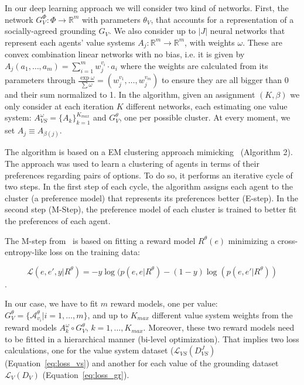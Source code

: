 \documentclass{ecai}
\newcommand{\R}{\mathbb{R}}
\newcommand{\A}{\mathcal{A}}
\newcommand{\abs}[1]{{\left|#1\right|}}
\begin{document}
In our deep learning approach we will consider two kind of networks. First, the network $G^\Phi_V : \Phi \to \R^m$ with parameters $\theta_V$, that accounts for a representation of a socially-agreed grounding $G_V$. We also consider up to $\abs{J}$ neural networks that represent each agents' value systems $A_j : \R^m \to \R^m$, with weights $\omega$. These are convex combination linear networks with no bias, i.e. it is given by $A_j (a_1, \dots, a_m) = \sum_{i=1}^m w_j^{v_i}\cdot a_i$ where the weights are calculated from its parameters through $\frac{\exp \omega}{\sum \omega} = (w_j^{v_1}, \dots, w_j^{v_m})$ to ensure they are all bigger than 0 and their sum normalized to 1. In the algorithm, given an assignment $(K,\beta)$ we only consider at each iteration $K$ different networks, each estimating one value system: $A_{VS}^\omega =\{A_{k}\}_{k=1}^{K_{max}}$ and $G_V^\theta$, one per possible cluster. At every moment, we set $A_j \equiv A_{\beta({j})}$.


The algorithm is based on a EM clustering approach mimicking~\cite{pmlr-v235-chakraborty24b} (Algorithm 2). The approach was used to learn a clustering of agents in terms of their preferences regarding pairs of options. To do so, it performs an iterative cycle of two steps. In the first step of each cycle, the algorithm assigns each agent to the cluster (a preference model) that represents its preferences better (E-step). In the second step (M-Step), the preference model of each cluster is trained to better fit the preferences of each agent. 

The M-step from~\cite{pmlr-v235-chakraborty24b} is based on fitting a reward model $R^\theta(e)$ minimizing a cross-entropy-like loss on the training data: 

$$\mathcal{L}(e,e',y|R^\theta) = -y\log(p(e,e|R^\theta)-(1-y)\log(p(e,e'|R^\theta))$$. 

In our case, we have to fit $m$ reward models, one per value: $G_V^\theta=\{\A_{v_i}^\theta| i=1,\dots, m\}$, and up to $K_{max}$ different value system weights from the reward models $A^\omega_k\circ G^\theta_V$, $k=1,\dots, K_{max}$. Moreover, these two reward models need to be fitted in a hierarchical manner (bi-level optimization). That implies two loss calculations, one for the value system dataset ($\mathcal{L}_{VS}(D_{VS}^J)$ (Equation~\ref{eq:loss_vs}) and another for each value of the grounding dataset $\mathcal{L}_{V}(D_V)$ (Equation~\ref{eq:loss_gr}).
\end{document}

